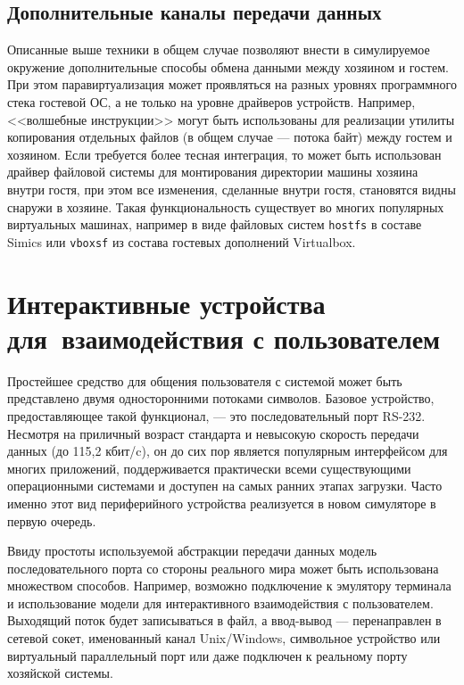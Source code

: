 \subsection{Дополнительные каналы передачи данных}

Описанные выше техники в общем случае позволяют внести в симулируемое окружение дополнительные способы обмена данными между хозяином и гостем. При этом паравиртуализация может проявляться на разных уровнях программного стека гостевой ОС, а не только на уровне драйверов устройств. Например, <<волшебные инструкции>> могут быть использованы для реализации утилиты копирования  отдельных файлов (в общем случае --- потока байт) между гостем и хозяином. Если требуется более тесная интеграция, то может быть использован драйвер файловой системы для монтирования директории машины хозяина внутри гостя, при этом все изменения, сделанные внутри гостя, становятся видны снаружи в хозяине. Такая функциональность существует во многих популярных виртуальных машинах, например в виде файловых систем \texttt{hostfs} в составе Simics или \texttt{vboxsf} из состава гостевых дополнений Virtualbox.

\section[Интерактивные устройства]{Интерактивные устройства для~взаимодействия с пользователем}

Простейшее средство для общения пользователя с системой может быть представлено двумя односторонними потоками символов. Базовое устройство, предоставляющее такой функционал, --- это последовательный порт RS-232. Несмотря на приличный возраст стандарта и невысокую скорость передачи данных (до 115,2 кбит/c), он до сих пор является популярным интерфейсом для многих приложений, поддерживается практически всеми существующими операционными системами и доступен на самых ранних этапах загрузки. Часто именно этот вид периферийного устройства реализуется в новом симуляторе в первую очередь. 

Ввиду простоты используемой абстракции передачи данных модель последовательного порта со стороны реального мира может быть использована множеством способов. Например, возможно подключение к эмулятору терминала и использование модели для интерактивного взаимодействия с пользователем. Выходящий поток  будет записываться в файл, а ввод-вывод --- перенаправлен в сетевой сокет, именованный канал Unix/Windows, символьное  устройство или виртуальный параллельный порт или даже подключен к реальному порту хозяйской системы.

